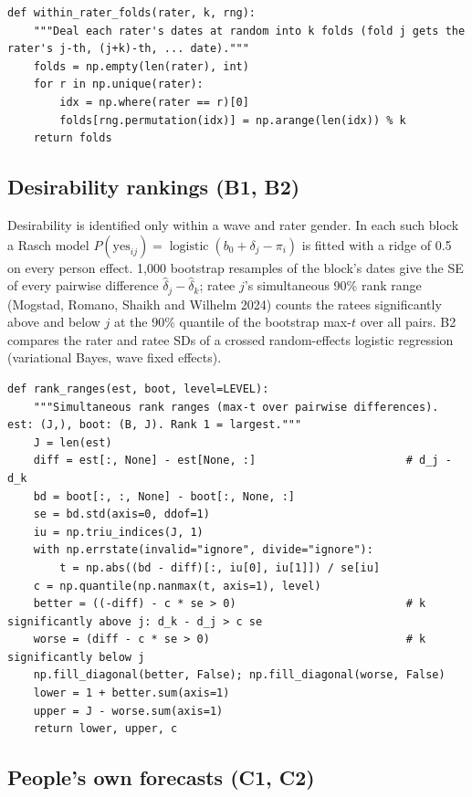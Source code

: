 \documentclass[11pt]{article}
\begin{document}
\begin{lstlisting}[caption={Within-rater folds (scripts/yes\_extensions.py)}]
def within_rater_folds(rater, k, rng):
    """Deal each rater's dates at random into k folds (fold j gets the rater's j-th, (j+k)-th, ... date)."""
    folds = np.empty(len(rater), int)
    for r in np.unique(rater):
        idx = np.where(rater == r)[0]
        folds[rng.permutation(idx)] = np.arange(len(idx)) % k
    return folds
\end{lstlisting}

\subsection{Desirability rankings (B1, B2)}

Desirability is identified only within a wave and rater gender. In each such block a Rasch model
$P(\text{yes}_{ij}) = \operatorname{logistic}(b_0 + \delta_j - \pi_i)$ is fitted with a ridge of 0.5 on
every person effect. 1,000 bootstrap resamples of the block's dates give the SE of every pairwise difference
$\hat\delta_j - \hat\delta_k$; ratee $j$'s simultaneous 90\% rank range (Mogstad, Romano, Shaikh and Wilhelm 2024) counts
the ratees significantly above and below $j$ at the 90\% quantile of the bootstrap max-$t$ over all pairs. B2 compares
the rater and ratee SDs of a crossed random-effects logistic regression (variational Bayes, wave fixed effects).

\begin{lstlisting}[caption={Simultaneous rank ranges (scripts/ranking.py)}]
def rank_ranges(est, boot, level=LEVEL):
    """Simultaneous rank ranges (max-t over pairwise differences). est: (J,), boot: (B, J). Rank 1 = largest."""
    J = len(est)
    diff = est[:, None] - est[None, :]                       # d_j - d_k
    bd = boot[:, :, None] - boot[:, None, :]
    se = bd.std(axis=0, ddof=1)
    iu = np.triu_indices(J, 1)
    with np.errstate(invalid="ignore", divide="ignore"):
        t = np.abs((bd - diff)[:, iu[0], iu[1]]) / se[iu]
    c = np.quantile(np.nanmax(t, axis=1), level)
    better = ((-diff) - c * se > 0)                          # k significantly above j: d_k - d_j > c se
    worse = (diff - c * se > 0)                              # k significantly below j
    np.fill_diagonal(better, False); np.fill_diagonal(worse, False)
    lower = 1 + better.sum(axis=1)
    upper = J - worse.sum(axis=1)
    return lower, upper, c
\end{lstlisting}

\subsection{People's own forecasts (C1, C2)}
\end{document}
